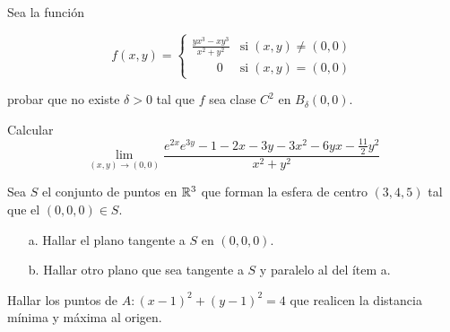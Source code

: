 
\begin{question}
    Sea la función

    \[
        f(x,y) =
        \begin{cases}
            \displaystyle \frac{yx^3-xy^3}{x^2+y^2} & \text{si}\; (x,y) \neq (0,0) \\[10pt]
            \qquad 0                                & \text{si}\; (x,y)=(0,0)
        \end{cases}
    \]

    probar que no existe $\delta>0$ tal que $f$ sea clase $C^2$ en $B_{\delta}(0,0)$.
\end{question}


\begin{question} Calcular
    \[
        \lim_{(x,y) \to (0,0)}
        \frac{e^{2x}e^{3y} - 1 - 2x -3y - 3x^2 - 6yx - \frac{11}{2}y^2}{x^2+y^2}
    \]
\end{question}


\begin{question}
    Sea $S$ el conjunto de puntos en  $\mathbb{R}^3$  que forman la esfera de centro $(3,4,5)$ tal que el $(0,0,0) \in S$.
    \begin{itemize}
        \item [a.] Hallar el plano tangente a $S$ en $(0,0,0)$.
        \item [b.] Hallar otro plano que sea tangente a $S$ y paralelo al del ítem a.
    \end{itemize}
\end{question}


\begin{question}
    Hallar los puntos de $A:(x-1)^2 + (y-1)^2 = 4$ que realicen la distancia mínima y máxima al origen.
\end{question}

\newpage

